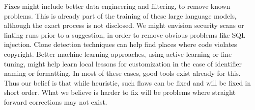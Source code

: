 Fixes might include better data engineering and filtering, to remove known problems. This is already part of the training of these large language models, although the exact process is not disclosed. 
We might envision security scans or linting runs prior to a suggestion, in order to remove obvious problems like SQL injection. 
Clone detection techniques can help find places where code violates copyright. 
Better machine learning approaches, using active learning or fine-tuning, might help learn local lessons \cite{tim} for customization in the case of identifier naming or formatting.
In most of these cases, good tools exist already for this. 
Thus our belief is that while heuristic, such flaws can be fixed and will be fixed in short order. What we believe is harder to fix will be problems where straight forward corrections may not exist.
